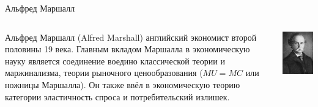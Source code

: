 \documentclass{beamer}
\begin{document}
\begin{frame}{Альфред Маршалл}
\begin{columns}
\begin{column}{0.5\textwidth}
   \alert{Альфред Маршалл} (Alfred Marshall) английский экономист второй половины 19 века. Главным вкладом Маршалла в экономическую науку является соединение воедино классической теории и маржинализма, теории рыночного ценообразования ($MU = MC$ или \alert{ножницы Маршалла}). Он также ввёл в экономическую теорию категории \alert{эластичность спроса} и  \alert{потребительский излишек}.
\end{column}
\begin{column}{0.5\textwidth}  %
    \begin{center}
     \includegraphics[width=1\textwidth]{Marshall}
     \end{center}
\end{column}
\end{columns}
\end{frame}
\end{document}
